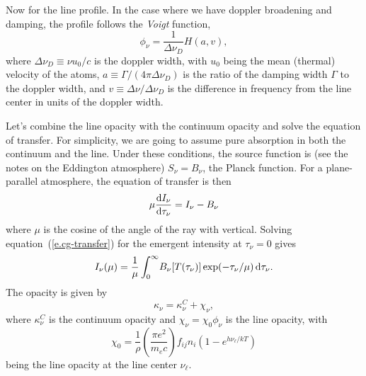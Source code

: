 Now for the line profile.  In the case where we have doppler broadening and damping, the profile follows the \emph{Voigt} function,
\begin{equation}\label{e.voigt} \phi_{\nu} = \frac{1}{\Delta \nu_{D}}H(a,v), \end{equation}
where $\Delta\nu_{D} \equiv \nu u_{0}/c$ is the doppler width, with $u_{0}$ being the mean (thermal) velocity of the atoms, $a \equiv \Gamma/(4\pi\Delta\nu_{D})$ is the ratio of the damping width $\Gamma$ to the doppler width, and $v \equiv \Delta\nu/\Delta\nu_{D}$ is the difference in frequency from the line center in units of the doppler width.

Let's combine the line opacity with the continuum opacity and solve the equation of transfer.
For simplicity, we are going to assume pure absorption in both the continuum and the line.  Under these conditions, the source function is (see the notes on the Eddington atmosphere) $S_{\nu} = B_{\nu}$, the Planck function. For a plane-parallel atmosphere, the equation of transfer is then
\begin{equation}\label{e.cg-transfer}
\mu\frac{\mathrm{d} I_{\nu}}{\mathrm{d}\tau_{\nu}} = I_{\nu} - B_{\nu}
\end{equation}
where $\mu$ is the cosine of the angle of the ray with vertical. Solving equation~(\ref{e.cg-transfer}) for the emergent intensity at $\tau_{\nu} = 0$ gives
\begin{equation}\label{e.intensity}
I_{\nu}(\mu) = \frac{1}{\mu}\int_{0}^{\infty}\!B_{\nu}[T(\tau_{\nu})] \exp(-\tau_{\nu}/\mu) \,\mathrm{d}\tau_{\nu}.
\end{equation}
The opacity is given by
\begin{equation}\label{e.total-opacity}
\kappa_{\nu} = \kappa_{\nu}^{C} + \chi_{\nu},
\end{equation}
where $\kappa_{\nu}^{C}$ is the continuum opacity and $\chi_{\nu} = \chi_{0}\phi_{\nu}$ is the line opacity, with 
\[
\chi_{0} = \frac{1}{\rho}\left(\frac{\pi e^{2}}{m_{e}c}\right)f_{ij}n_{i}\left(1 - e^{h\nu_{\ell}/kT}\right)
\]
being the line opacity at the line center $\nu_{\ell}$. 


